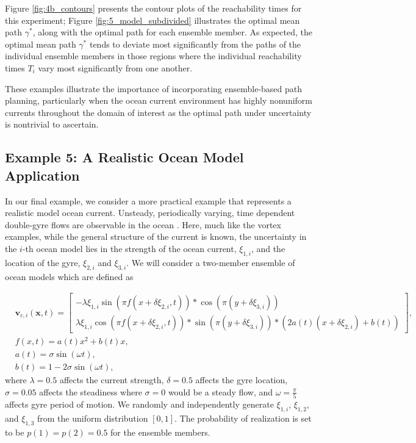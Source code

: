 \documentclass[pdflatex,sn-mathphys-num]{sn-jnl}%
\def \bx{{\mathbf {x}}}
\def \bv{{\mathbf {v}}}
\theoremstyle{thmstyleone}%
\theoremstyle{thmstyletwo}%
\theoremstyle{thmstylethree}%
\begin{document}
Figure \ref{fig:4b_contours} presents the contour plots of the reachability times for this experiment; Figure \ref{fig:5_model_subdivided} illustrates the optimal mean path $\gamma^*$, along with the optimal path for each ensemble member.  As expected, the optimal mean path $\gamma^*$ tends to deviate most significantly from the paths of the individual ensemble members in those regions where the individual reachability times $T_i$ vary most significantly from one another.

These examples illustrate the importance of incorporating ensemble-based path planning, particularly when the ocean current environment has highly nonuniform currents throughout the domain of interest as the optimal path under uncertainty is nontrivial to ascertain.












\subsection{Example 5: A Realistic Ocean Model Application}

In our final example, we consider a more practical example that represents a realistic model ocean current.  Unsteady, periodically varying, time dependent double-gyre flows are observable in the ocean \cite{Shadden2005, Wang2016}.  Here, much like the vortex examples, while the general structure of the current is known, the uncertainty in the $i$-th ocean model lies in the strength of the ocean current, $\xi_{1,i}$, and the location of the gyre, $\xi_{2,i}$ and $\xi_{3,i}$.  We will consider a two-member ensemble of ocean models which are defined as

\begin{align}
    &\bv_{c,i}(\bx,t) = \begin{bmatrix}
    -\lambda \xi_{1,i} \sin(\pi f(x+\delta \xi_{2,i},t))*\cos(\pi(y+\delta \xi_{3,i}))\\
    \lambda \xi_{1,i} \cos(\pi f(x+\delta \xi_{2,i},t))*\sin(\pi(y+\delta \xi_{3,i})) *(2a(t)(x + \delta \xi_{2,i}) + b(t))
    \end{bmatrix}, \\
    &f(x,t) = a(t)x^2 + b(t)x, \\
    &a(t) = \sigma \sin(\omega t), \\
    &b(t) = 1 - 2\sigma \sin (\omega t),
\end{align}
where $\lambda = 0.5$ affects the current strength, $\delta=0.5$ affects the gyre location, $\sigma=0.05$ affects the steadiness where $\sigma=0$ would be a steady flow, and $\omega = \frac{\pi}{5}$ affects gyre period of motion.  We randomly and independently generate $\xi_{1,i}$, $\xi_{1,2}$, and $\xi_{1,3}$ from the uniform distribution $[0,1]$.  The probability of realization is set to be $p(1)=p(2)=0.5$ for the ensemble members.
\end{document}
